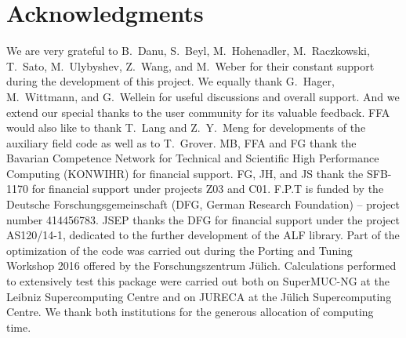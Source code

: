 

\section*{Acknowledgments} 

%

We are very grateful to  B.~Danu, S.~Beyl, M.~Hohenadler,  M.~Raczkowski, T.~Sato,  M.~Ulybyshev, Z.~Wang, and M.~Weber for their constant support during the development of this project.
We equally thank G.~Hager, M.~Wittmann, and G.~Wellein for useful discussions and overall support. And we extend our special thanks to the user community for its valuable feedback.
FFA would also like to thank T.~Lang  and Z.~Y.~Meng for developments of the auxiliary field code as well as to T.~Grover. 
MB, FFA  and FG thank the Bavarian Competence Network for Technical and Scientific High Performance Computing (KONWIHR) for financial support.
FG, JH, and JS thank the SFB-1170 for  financial support under projects Z03 and C01.
F.P.T is funded by the Deutsche Forschungsgemeinschaft (DFG, German Research Foundation) -- project number 414456783.
JSEP  thanks the DFG for financial support under the project AS120/14-1, dedicated to the further development of the ALF library.
Part of the optimization of the code was carried out during  the  Porting and Tuning Workshop 2016 offered by the Forschungszentrum J\"ulich.
Calculations performed to extensively test this package were carried out both on  SuperMUC-NG at the  Leibniz Supercomputing Centre and on  JURECA  \cite{Jureca16} at the J\"ulich Supercomputing Centre.  We thank both institutions for the generous allocation of computing time.

